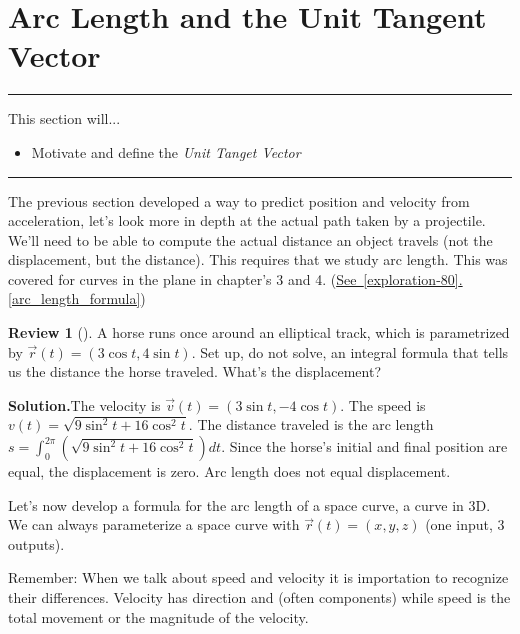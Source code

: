 \documentclass[10pt,]{book}
\theoremstyle{plain}
\theoremstyle{definition}
\theoremstyle{definition}
\theoremstyle{definition}
\newtheorem{project}{Review}[section]
\theoremstyle{definition}
\newenvironment{objectives}[1]{\noindent\rule{\linewidth}{0.1ex}\newline{\textbf{{\large#1}}\par\smallskip}}{\par\noindent\rule{\linewidth}{0.1ex}\par\smallskip}
\theoremstyle{definition}
\numberwithin{equation}{section}
\newcommand{\ds}{\displaystyle}
\begin{document}
\section[{Arc Length and the Unit Tangent Vector}]{Arc Length and the Unit Tangent Vector}\label{ch08_02_unit_tangent}
\begin{objectives}{Objectives}\label{objectives-17}
This section will...%
%
\begin{itemize}[label=\textbullet]
\item{}Motivate and define the \emph{Unit Tanget Vector}%
\end{itemize}
\end{objectives}
The previous section developed a way to predict position and velocity from acceleration, let's look more in depth at the actual path taken by a projectile. We'll need to be able to compute the actual distance an object travels (not the displacement, but the distance). This requires that we study arc length. This was covered for curves in the plane in chapter's 3 and 4. (\hyperref[arc_length_formula]{See~\ref{exploration-80}.\ref{arc_length_formula}})%
\begin{project}[]\label{project-9}
A horse runs once around an elliptical track, which is parametrized by \(\vec r(t) = (3\cos t,4\sin t)\). Set up, do not solve, an integral formula that tells us the distance the horse traveled. What's the displacement?%
\par\medskip\noindent%
\textbf{Solution.}\quad The velocity is \(\vec v(t) = (3\sin t, -4\cos t)\). The speed is \(v(t) = \sqrt{9\sin^2t+16\cos^2t}\). The distance traveled is the arc length \(\ds s=\int_0^{2\pi} \left(\sqrt{9\sin^2t+16\cos^2t}\right)dt\). Since the horse's initial and final position are equal, the displacement is zero. Arc length does not equal displacement.%
\end{project}
Let's now develop a formula for the arc length of a space curve, a curve in 3D. We can always parameterize a space curve with \(\vec r(t) = (x,y,z)\) (one input, 3 outputs).%
\par
Remember: When we talk about speed and velocity it is importation to recognize their differences. Velocity has direction and (often components) while speed is the total movement or the magnitude of the velocity.%
\end{document}
